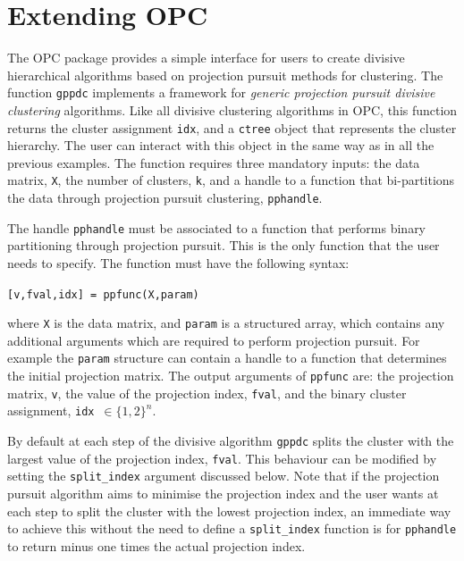 \documentclass{book}
\begin{document}

\chapter{Extending OPC}\label{sec:extend}


The OPC package provides a simple interface for users to create divisive
hierarchical algorithms based on projection pursuit methods for clustering. 
%
The function {\tt gppdc} implements a framework for {\em generic projection
pursuit divisive clustering} algorithms.
%
Like all divisive clustering algorithms in OPC, this function returns the cluster
assignment {\tt idx}, and a {\tt ctree} object that represents the cluster
hierarchy. The user can interact with this object in the same way as in all the
previous examples.
%
The function requires three mandatory inputs: the data matrix, {\tt X}, the
number of clusters, {\tt k}, and a handle to a function that bi-partitions the
data through projection pursuit clustering, {\tt pphandle}.
%

The handle {\tt pphandle} must be associated to a function that performs
binary partitioning through projection pursuit. This is the only function that
the user needs to specify. The function must have the following syntax:

\begin{center}
{\tt [v,fval,idx] = ppfunc(X,param)}
\end{center}
%
where {\tt X} is the data matrix, and {\tt param} is a structured array, which
%
contains any additional arguments which are required to perform projection pursuit.
%
For example the {\tt param} structure can contain a handle to a function that
determines the initial projection matrix.
%
The output arguments of {\tt ppfunc}
are: the projection matrix, {\tt v}, the value of the projection index,
{\tt fval}, and the binary cluster assignment, {\tt idx}~$\in \{1,2\}^n$.

By default at each step of the divisive algorithm {\tt gppdc} splits the cluster
with the largest value of the projection index, {\tt fval}. This behaviour can
be modified by setting the {\tt split\_index} argument discussed below.
Note that if the projection
pursuit algorithm aims to minimise the projection index and the user wants at each
step to split the cluster with the lowest projection index, an immediate
way to achieve this without the need to define a {\tt split\_index} function 
is for {\tt pphandle} to return minus one times the actual projection index.
\end{document}
